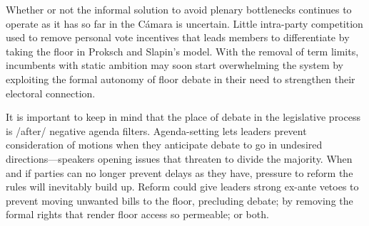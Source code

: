 \documentclass[letter,12pt]{article}
\begin{document}
Whether or not the informal solution to avoid plenary bottlenecks continues to operate as it has so far in the Cámara is uncertain. Little intra-party competition used to remove personal vote incentives that leads members to differentiate by taking the floor in Proksch and Slapin's model. With the removal of term limits, incumbents with static ambition may soon start overwhelming the system by exploiting the formal autonomy of floor debate in their need to strengthen their electoral connection.

It is important to keep in mind that the place of debate in the legislative process is /after/ negative agenda filters. Agenda-setting lets leaders prevent consideration of motions when they anticipate debate to go in undesired directions---speakers opening issues that threaten to divide the majority. When and if parties can no longer prevent delays as they have, pressure to reform the rules will inevitably build up. Reform could give leaders strong ex-ante vetoes to prevent moving unwanted bills to the floor, precluding debate; by removing the formal rights that render floor access so permeable; or both. 




\end{document}
